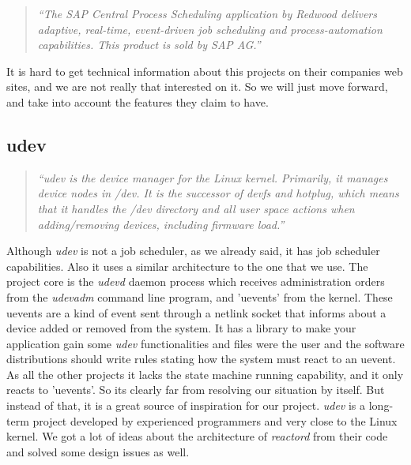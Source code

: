 \begin{quote}
  \emph{	
    ``The SAP Central Process Scheduling application by Redwood delivers adaptive, real-time, event-driven job scheduling and 
    process-automation capabilities. This product is sold by SAP AG.''
  }
\end{quote}
It is hard to get technical information about this projects on their companies web sites, and we are not really that interested on it. So
we will just move forward, and take into account the features they claim to have.
\subsection{udev}
\begin{quote}
  \emph{
    ``udev is the device manager for the Linux kernel. Primarily, it manages device nodes in /dev. It is the successor of devfs and 
    hotplug, which means that it handles the /dev directory and all user space actions when adding/removing devices, including firmware 
    load.''\cite{wp:udev}
  }
\end{quote}
Although \emph{udev} is not a job scheduler, as we already said, it has job scheduler capabilities. Also it uses a similar architecture to
the one that we use. The project core is the \emph{udevd} daemon process which receives administration orders from the \emph{udevadm}
command line program, and 'uevents' from the kernel. These uevents are a kind of event sent through a netlink socket that informs about
a device added or removed from the system. It has a library to make your application gain some \emph{udev} functionalities and files were 
the user and the software distributions should write rules stating how the system must react to an uevent.\\
As all the other projects it lacks the state machine running capability, and it only reacts to 'uevents'. So its clearly far from resolving
our situation by itself. But instead of that, it is a great source of inspiration for our project. \emph{udev} is a long-term project 
developed by experienced programmers and very close to the Linux kernel. We got a lot of ideas about the architecture of \emph{reactord} 
from their code and solved some design issues as well.
